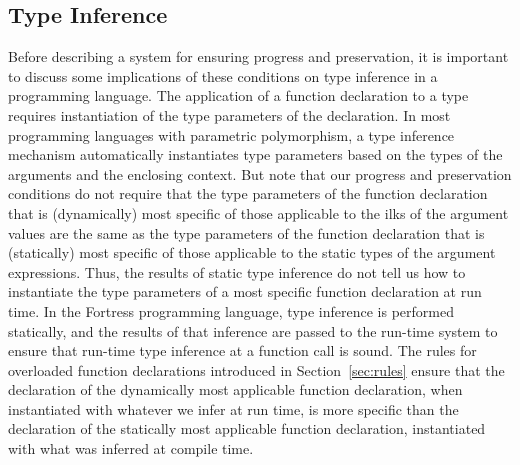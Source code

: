 \subsection{Type Inference}

Before describing a system for ensuring progress and preservation,
it is important to discuss some implications of these conditions on
type inference in a programming language.
The application of a function declaration to a type requires
instantiation of the type parameters of the declaration.
In most programming languages with parametric polymorphism,
a type inference mechanism automatically instantiates type parameters
based on the types of the arguments and the enclosing context.
But note that our progress and preservation conditions do not require
that the type parameters of the function declaration 
that is (dynamically) most specific 
of those applicable to the ilks of the argument values 
are the same as the type parameters
of the function declaration that is (statically) most specific 
of those applicable to the static types of the argument expressions.
Thus, the results of static type inference do not tell us how to
instantiate the type parameters of a most specific function
declaration at run time.  
In the Fortress programming language,
type inference is performed statically, 
and the results of that inference 
are passed to the run-time system 
to ensure that run-time type inference at a function call is sound.
The rules for overloaded function declarations
introduced in Section~\ref{sec:rules} ensure that
the declaration of the dynamically most applicable function declaration,
when instantiated with whatever we infer at run time,
is more specific than the declaration of the statically most applicable
function declaration, instantiated with what was inferred at compile time.





